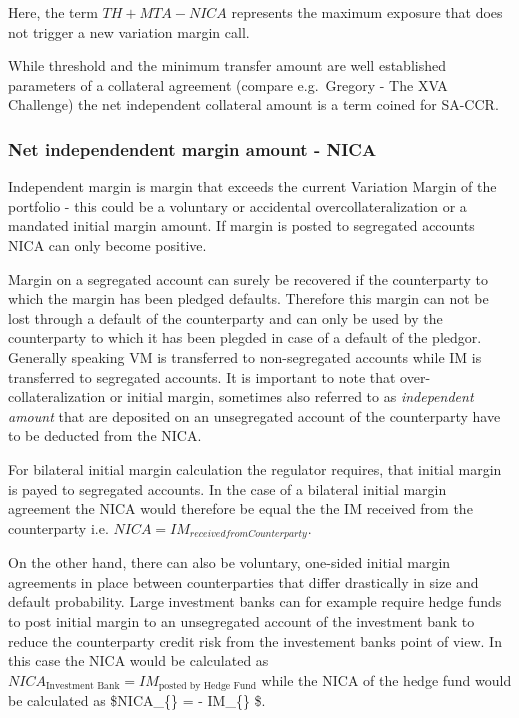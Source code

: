 Here, the term \(TH+MTA-NICA\) represents the maximum exposure that does
not trigger a new variation margin call.

While threshold and the minimum transfer amount are well established
parameters of a collateral agreement (compare e.g.~Gregory - The XVA
Challenge) the net independent collateral amount is a term coined for
SA-CCR.

\hypertarget{net-independendent-margin-amount---nica}{%
\subsubsection{Net independendent margin amount -
NICA}\label{net-independendent-margin-amount---nica}}

Independent margin is margin that exceeds the current Variation Margin
of the portfolio - this could be a voluntary or accidental
overcollateralization or a mandated initial margin amount. If margin is
posted to segregated accounts NICA can only become positive.

Margin on a segregated account can surely be recovered if the
counterparty to which the margin has been pledged defaults. Therefore
this margin can not be lost through a default of the counterparty and
can only be used by the counterparty to which it has been plegded in
case of a default of the pledgor. Generally speaking VM is transferred
to non-segregated accounts while IM is transferred to segregated
accounts. It is important to note that over-collateralization or initial
margin, sometimes also referred to as \emph{independent amount} that are
deposited on an unsegregated account of the counterparty have to be
deducted from the NICA.

For bilateral initial margin calculation the regulator requires, that
initial margin is payed to segregated accounts. In the case of a
bilateral initial margin agreement the NICA would therefore be equal the
the IM received from the counterparty i.e.
\(NICA = IM_{received from Counterparty}\).

On the other hand, there can also be voluntary, one-sided initial margin
agreements in place between counterparties that differ drastically in
size and default probability. Large investment banks can for example
require hedge funds to post initial margin to an unsegregated account of
the investment bank to reduce the counterparty credit risk from the
investement banks point of view. In this case the NICA would be
calculated as
\(NICA_{\text{Investment Bank}} = IM_{\text{posted by Hedge Fund}}\)
while the NICA of the hedge fund would be calculated as
\$NICA\_\{\} = - IM\_\{\}
\$.

